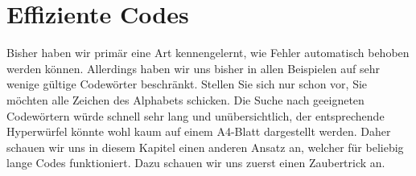 \clearpage
\section{Effiziente Codes}

Bisher haben wir primär eine Art kennengelernt, wie Fehler automatisch behoben werden können. Allerdings haben wir uns bisher in allen Beispielen auf sehr wenige gültige Codewörter beschränkt. Stellen Sie sich nur schon vor, Sie möchten alle Zeichen des Alphabets schicken. Die Suche nach geeigneten Codewörtern würde schnell sehr lang und unübersichtlich, der entsprechende Hyperwürfel könnte wohl kaum auf einem A4-Blatt dargestellt werden. Daher schauen wir uns in diesem Kapitel einen anderen Ansatz an, welcher für beliebig lange Codes funktioniert. Dazu schauen wir uns zuerst einen Zaubertrick an.








